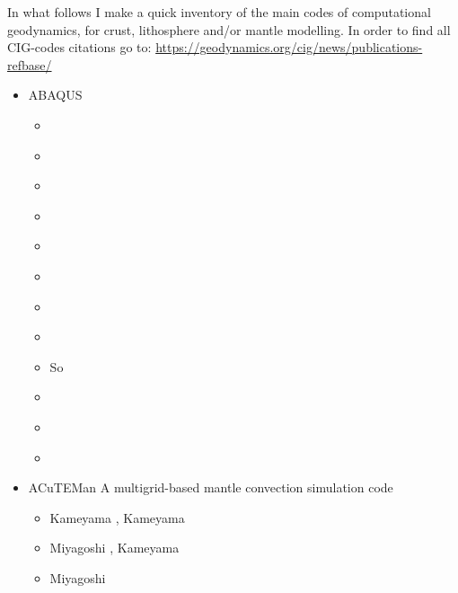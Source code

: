 
In what follows I make a quick inventory of the main codes of computational geodynamics, 
for crust, lithosphere and/or mantle modelling.
In order to find all CIG-codes citations go to: 
\url{https://geodynamics.org/cig/news/publications-refbase/}

\begin{itemize}

\item {\codefont ABAQUS} 

\begin{scriptsize}
\begin{itemize}
\item[\twothousandone] \cite{brry01}
\item[\twothousandtwo] \cite{gedh02}
\item[\twothousandthree] \cite{fumr03}
\item[\twothousandsix] \cite{hapf06}
\item[\twothousandseven] \cite{camg07}
\item[\twothousandnine] \cite{kuhe09}\cite{makh09}
\item[\twothousandten] \cite{camg10}
\item[\twothousandtwelve] \cite{nalr12}
\item[\twothousandthirteen] So \etal \cite{soyl13}
\item[\twothousandfifteen] \cite{pevp15}
\item[\twothousandseventeen] \cite{naam17}
\item[\twothousandeighteen] \cite{naam18}
\end{itemize}
\end{scriptsize}

\item {\codefont ACuTEMan} 
A multigrid-based mantle convection simulation code

\begin{scriptsize}
\begin{itemize}
\item[\twothousandfive] Kameyama \cite{kame05}, Kameyama \etal \cite{kaks05}
\item[\twothousandfifteen] Miyagoshi \etal \cite{miko15}, Kameyama \etal \cite{kamo15}
\item[\twothousandtwenty] Miyagoshi \etal \cite{miko20} 
\end{itemize}
\end{scriptsize}


\end{itemize}
